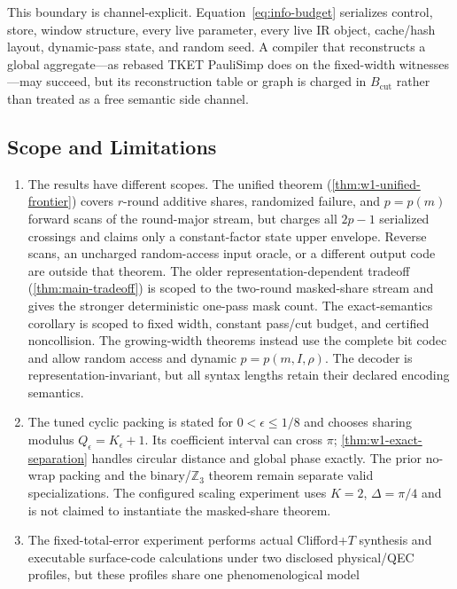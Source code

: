 \documentclass[aps,prx,reprint,floatfix,superscriptaddress]{revtex4-2}
\begin{document}
This boundary is channel-explicit.  Equation~\eqref{eq:info-budget}
serializes control, store, window structure, every live parameter, every
live IR object, cache/hash layout, dynamic-pass state, and random seed.  A
compiler that reconstructs a global aggregate---as
rebased TKET PauliSimp does on the fixed-width witnesses---may succeed, but
its reconstruction table or graph is charged in $B_{\mathrm{cut}}$ rather
than treated as a free semantic side channel.

\subsection{Scope and Limitations}

\begin{enumerate}[leftmargin=1.5em]
    \item The results have different scopes.  The unified theorem
    (\cref{thm:w1-unified-frontier}) covers $r$-round additive shares,
    randomized failure, and $p=p(m)$ forward scans of the round-major
    stream, but charges all $2p-1$ serialized crossings and claims only a
    constant-factor state upper envelope.  Reverse scans, an uncharged
    random-access input oracle, or a different output code are outside that
    theorem.  The older representation-dependent tradeoff
    (\cref{thm:main-tradeoff}) is scoped to the two-round masked-share
    stream and gives the stronger deterministic one-pass mask count.  The
    exact-semantics corollary is scoped to fixed width, constant pass/cut
    budget, and certified noncollision.  The growing-width theorems instead
    use the complete bit codec and allow random access and dynamic
    $p=p(m,I,\rho)$.  The decoder is representation-invariant, but all
    syntax lengths retain their declared encoding semantics.
    \item The tuned cyclic packing is stated for
    $0<\epsilon\leq1/8$ and chooses sharing modulus
    $Q_\epsilon=K_\epsilon+1$.  Its coefficient interval can cross $\pi$;
    \cref{thm:w1-exact-separation} handles circular distance and global
    phase exactly.  The prior no-wrap packing and the binary/$\mathbb Z_3$
    theorem remain separate valid specializations.
    The configured scaling experiment uses $K=2$, $\Delta=\pi/4$ and is not
    claimed to instantiate the masked-share theorem.
    \item The fixed-total-error experiment performs actual Clifford+$T$
    synthesis and executable surface-code calculations under two disclosed
    physical/QEC profiles, but these profiles share one phenomenological model

\end{enumerate}
\end{document}
